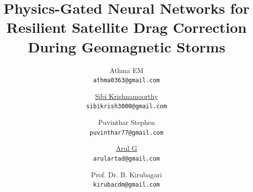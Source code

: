 \documentclass[twocolumn]{article}
\begin{document}
\title{\textbf{Physics-Gated Neural Networks for Resilient Satellite Drag Correction During Geomagnetic Storms}}

\date{}


\author{
  Athma EM \\
  \texttt{athma0363@gmail.com}
  \and
  \href{https://orcid.org/0009-0002-8127-9957}{Sibi Krishnamoorthy} \\
  \texttt{sibikrish3000@gmail.com}
  \and
  Puvinthar Stephen \\
  \texttt{puvinthar77@gmail.com}
  \and
  \href{https://orcid.org/0009-0002-7740-7725}{Arul G} \\
  \texttt{arulartad@gmail.com}
  \and
  Prof. Dr. B. Kirubagari \\
  \texttt{kirubacdm@gmail.com}
}






\end{document}
